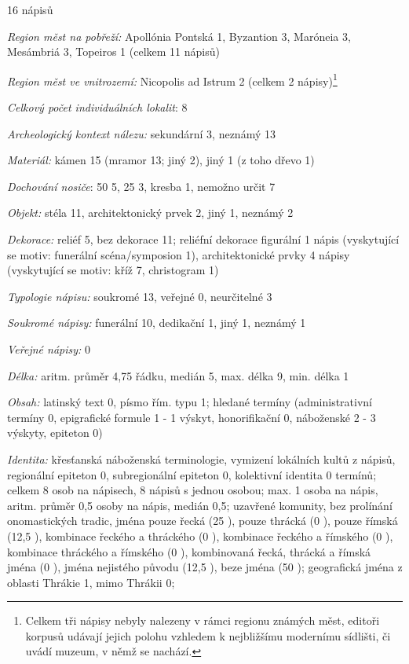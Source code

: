\placetable[none]{}
\starttable[|l|]
\HL
{} 16 nápisů

{\em Region měst na pobřeží:} Apollónia Pontská 1, Byzantion 3, Maróneia 3, Mesámbriá 3, Topeiros 1 (celkem 11 nápisů)

{\em Region měst ve vnitrozemí:} Nicopolis ad Istrum 2 (celkem 2 nápisy)\footnote{Celkem tři nápisy nebyly nalezeny v rámci regionu známých měst, editoři korpusů udávají jejich polohu vzhledem k nejbližšímu modernímu sídlišti, či uvádí muzeum, v němž se nachází.}

{\em Celkový počet individuálních lokalit}: 8

{\em Archeologický kontext nálezu:} sekundární 3, neznámý 13

{\em Materiál:} kámen 15 (mramor 13; jiný 2), jiný 1 (z toho dřevo 1)

{\em Dochování nosiče}: 50  5, 25  3, kresba 1, nemožno určit 7

{\em Objekt:} stéla 11, architektonický prvek 2, jiný 1, neznámý 2

{\em Dekorace:} reliéf 5, bez dekorace 11; reliéfní dekorace figurální 1 nápis (vyskytující se motiv: funerální scéna/symposion 1), architektonické prvky 4 nápisy (vyskytující se motiv: kříž 7, christogram 1)

{\em Typologie nápisu:} soukromé 13, veřejné 0, neurčitelné 3

{\em Soukromé nápisy:} funerální 10, dedikační 1, jiný 1, neznámý 1

{\em Veřejné nápisy:} 0

{\em Délka:} aritm. průměr 4,75 řádku, medián 5, max. délka 9, min. délka 1

{\em Obsah:} latinský text 0, písmo řím. typu 1; hledané termíny (administrativní termíny 0, epigrafické formule 1 - 1 výskyt, honorifikační 0, náboženské 2 - 3 výskyty, epiteton 0)

{\em Identita:} křesťanská náboženská terminologie, vymizení lokálních kultů z nápisů, regionální epiteton 0, subregionální epiteton 0, kolektivní identita 0 termínů; celkem 8 osob na nápisech, 8 nápisů s jednou osobou; max. 1 osoba na nápis, aritm. průměr 0,5 osoby na nápis, medián 0,5; uzavřené komunity, bez prolínání onomastických tradic, jména pouze řecká (25 ), pouze thrácká (0 ), pouze římská (12,5 ), kombinace řeckého a thráckého (0 ), kombinace řeckého a římského (0 ), kombinace thráckého a římského (0 ), kombinovaná řecká, thrácká a římská jména (0 ), jména nejistého původu (12,5 ), beze jména (50 ); geografická jména z oblasti Thrákie 1, mimo Thrákii 0;


